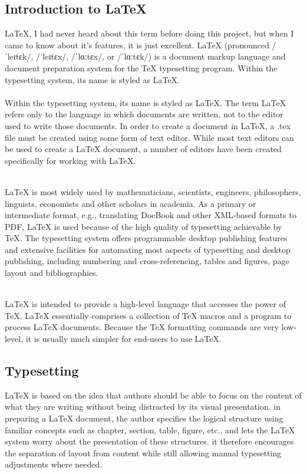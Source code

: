 \subsection{Introduction to \LaTeX}

\LaTeX, I had never heard about this term before doing this project, but when I came to know about it's features, it is just excellent. LaTeX (pronounced /ˈleɪtɛk/, /ˈleɪtɛx/, /ˈlɑːtɛx/, or /ˈlɑːtɛk/) is a document markup language and document preparation system for the \TeX{} typesetting  program. Within the typesetting system, its name is styled as \LaTeX.\\\\
Within the typesetting system, its name is styled as \LaTeX. The term \LaTeX{} refers only to the language in which documents are written, not to the editor used to write those documents. In order to create a document in \LaTeX, a .tex file must be created using some form of text editor. While most text editors can be used to create a \LaTeX{} document, a number of editors have been created specifically for working with \LaTeX.\\\\
\par \LaTeX{} is most widely used by mathematicians, scientists, engineers, philosophers, linguists, economists and other scholars in academia. As a primary or intermediate format, e.g., translating DocBook and other XML-based formats to PDF, \LaTeX{} is used because of the high quality of typesetting achievable by \TeX. The typesetting system offers programmable desktop publishing features and extensive facilities for automating most aspects of typesetting and desktop publishing, including numbering and cross-referencing, tables and figures, page layout and bibliographies.\\\\
\par \LaTeX{} is intended to provide a high-level language that accesses the power of \TeX. \LaTeX{} essentially comprises a collection of \TeX{} macros and a program to process LaTeX documents. Because the \TeX{} formatting commands are very low-level, it is usually much simpler for end-users to use \LaTeX{}.


\subsection{Typesetting}
\LaTeX{} is based on the idea that authors should be able to focus on the content of what they are writing without being distracted by its visual presentation. in preparing a \LaTeX{} document, the author specifies the logical structure using familiar concepts such as chapter, section, table, figure, etc., and lets the \LaTeX{} system worry about the presentation of these structures. it therefore encourages the separation of layout from content while still allowing manual typesetting adjustments where needed. 

